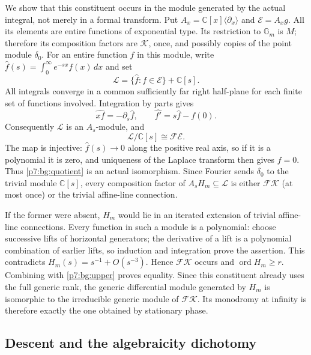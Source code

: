 \documentclass[11pt,a4paper]{article}
\theoremstyle{definition}
\theoremstyle{remark}
\numberwithin{equation}{section}
\begin{document}
We show that this constituent occurs in the module generated by the
actual integral, not merely in a formal transform.  Put
$A_x=\mathbb C[x]\langle\partial_x\rangle$ and
$\mathcal E=A_xg$.  All its elements are entire functions of
exponential type.  Its restriction to $\mathbb G_m$ is $M$;
therefore its composition factors are $\mathcal K$, once, and
possibly copies of the point module $\delta_0$.
For an entire function $f$ in this module, write
$\widehat f(s)=\int_0^\infty e^{-sx}f(x)\,dx$ and set
\[
 \mathcal L=\{\widehat f:f\in\mathcal E\}+\mathbb C[s].
\]
All integrals converge in a common sufficiently far right half-plane
for each finite set of functions involved.  Integration by parts gives
\[
 \widehat{xf}=-\partial_s\widehat f,
 \qquad \widehat{f'}=s\widehat f-f(0).
\]
Consequently $\mathcal L$ is an $A_s$-module, and
\begin{equation}\label{p7:bg:quotient}
 \mathcal L/\mathbb C[s]\cong\mathcal F\mathcal E.
\end{equation}
The map is injective: $\widehat f(s)\to0$ along the positive real
axis, so if it is a polynomial it is zero, and uniqueness of the
Laplace transform then gives $f=0$.  Thus \eqref{p7:bg:quotient} is
an actual isomorphism.  Since Fourier sends $\delta_0$ to the
trivial module $\mathbb C[s]$, every composition factor of
$A_sH_m\subseteq\mathcal L$ is either $\mathcal F\mathcal K$
(at most once) or the trivial affine-line connection.

If the former were absent, $H_m$ would lie in an iterated extension
of trivial affine-line connections.  Every function in such a module
is a polynomial: choose successive lifts of horizontal generators;
the derivative of a lift is a polynomial combination of earlier
lifts, so induction and integration prove the assertion.  This
contradicts $H_m(s)=s^{-1}+O(s^{-3})$.  Hence
$\mathcal F\mathcal K$ occurs and
$\operatorname{ord}H_m\ge r$.  Combining with \eqref{p7:bg:upper}
proves equality.  Since this constituent already uses the full
generic rank, the generic differential module generated by $H_m$
is isomorphic to the irreducible generic module of
$\mathcal F\mathcal K$.  Its monodromy at infinity is therefore
exactly the one obtained by stationary phase.

\subsection{Descent and the algebraicity dichotomy}
\end{document}
